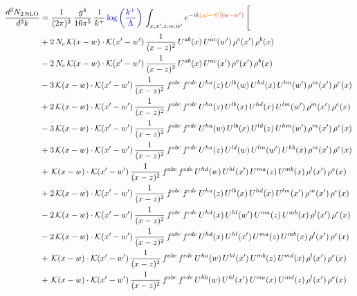 \documentclass[9pt]{article}
\numberwithin{equation}{section}
\begin{document}
\begin{align}
\frac{d^{3}N_{2\,\mathrm{NLO}}}{d^{3}k} & = \frac{1}{(2\pi)^{3}}\,\frac{g^{4}}{16\pi^{5}}\,\frac{1}{k^{+}}\,{\color{blue}\log{\left(\frac{k^{+}}{\Lambda}\right)}}\,\int_{x,x',z,w,w'}e^{-ik{\color{orange}\cancel{(w'-w)}}{\color{red}(w-w')}}\,\Bigg[
\notag\\ &+2\,N_{c}\,\mathcal{K}(x-w)\cdot\mathcal{K}(x'-w')\,\frac{1}{(x-z)^{2}}\,U^{ab}(x)\,U^{ac}(w')\,\rho^{c}(x')\,\rho^{b}(x)\notag\\
&-2\,N_{c}\,\mathcal{K}(x-w)\cdot\mathcal{K}(x'-w')\,\frac{1}{(x-z)^{2}}\,U^{ab}(x)\,U^{ac}(x')\,\rho^{c}(x')\,\rho^{b}(x)\notag\\
&-3\,\mathcal{K}(x-w)\cdot\mathcal{K}(x'-w')\,\frac{1}{(x-z)^{2}}\,f^{abc}\,f^{cde}\,U^{ha}(z)\,U^{lb}(w)\,U^{hd}(x)\,U^{lm}(w')\,\rho^{m}(x')\,\rho^{e}(x)\notag\\
&+2\,\mathcal{K}(x-w)\cdot\mathcal{K}(x'-w')\,\frac{1}{(x-z)^{2}}\,f^{abc}\,f^{cde}\,U^{ha}(z)\,U^{lb}(x)\,U^{hd}(x)\,U^{lm}(w')\,\rho^{m}(x')\,\rho^{e}(x)\notag\\
&-3\,\mathcal{K}(x-w)\cdot\mathcal{K}(x'-w')\,\frac{1}{(x-z)^{2}}\,f^{abc}\,f^{cde}\,U^{ha}(w)\,U^{lb}(x)\,U^{ld}(z)\,U^{hm}(w')\,\rho^{m}(x')\,\rho^{e}(x)\notag\\
&+3\,\mathcal{K}(x-w)\cdot\mathcal{K}(x'-w')\,\frac{1}{(x-z)^{2}}\,f^{abc}\,f^{cde}\,U^{ha}(z)\,U^{ld}(w)\,U^{lm}(w')\,U^{hb}(x)\,\rho^{m}(x')\,\rho^{e}(x)\notag\\
&+\,\mathcal{K}(x-w)\cdot\mathcal{K}(x'-w')\,\frac{1}{(x-z)^{2}}\,f^{abc}\,f^{cde}\,U^{hd}(w)\,U^{hl}(x')\,U^{ma}(z)\,U^{mb}(x)\,\rho^{l}(x')\,\rho^{e}(x)\notag\\
&+2\,\mathcal{K}(x-w)\cdot\mathcal{K}(x'-w')\,\frac{1}{(x-z)^{2}}\,f^{abc}\,f^{cde}\,U^{ha}(z)\,U^{lb}(x)\,U^{hd}(x)\,U^{lm}(x')\,\rho^{m}(x')\,\rho^{e}(x)\notag\\
&-2\,\mathcal{K}(x-w)\cdot\mathcal{K}(x'-w')\,\frac{1}{(x-z)^{2}}\,f^{abc}\,f^{cde}\,U^{hd}(x)\,U^{hl}(w')\,U^{ma}(z)\,U^{mb}(x)\,\rho^{l}(x')\,\rho^{e}(x)\notag\\
&-2\,\mathcal{K}(x-w)\cdot\mathcal{K}(x'-w')\,\frac{1}{(x-z)^{2}}\,f^{abc}\,f^{cde}\,U^{hd}(x)\,U^{hl}(x')\,U^{ma}(z)\,U^{mb}(x)\,\rho^{l}(x')\,\rho^{e}(x)\notag\\
&+\,\mathcal{K}(x-w)\cdot\mathcal{K}(x'-w')\,\frac{1}{(x-z)^{2}}\,f^{abc}\,f^{cde}\,U^{ha}(w)\,U^{hl}(x')\,U^{mb}(z)\,U^{md}(x)\,\rho^{l}(x')\,\rho^{e}(x)\notag\\
&+\,\mathcal{K}(x-w)\cdot\mathcal{K}(x'-w')\,\frac{1}{(x-z)^{2}}\,f^{abc}\,f^{cde}\,U^{hb}(w)\,U^{hl}(x')\,U^{ma}(x)\,U^{md}(z)\,\rho^{l}(x')\,\rho^{e}(x)\notag\\

\end{align}
\end{document}
